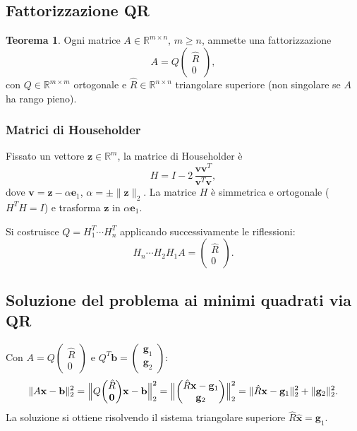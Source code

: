 \documentclass[12pt,a4paper]{article}
\theoremstyle{definition}
\newtheorem{teorema}{Teorema}[section]
\begin{document}
\subsection{Fattorizzazione QR}

\begin{teorema}
Ogni matrice $A \in \mathbb{R}^{m \times n}$, $m \geq n$, ammette una fattorizzazione
\[
  A = Q \begin{pmatrix} \hat{R} \\ 0 \end{pmatrix},
\]
con $Q \in \mathbb{R}^{m \times m}$ ortogonale e $\hat{R} \in \mathbb{R}^{n \times n}$ triangolare superiore (non singolare se $A$ ha rango pieno).
\end{teorema}

\subsubsection{Matrici di Householder}

Fissato un vettore $\mathbf{z} \in \mathbb{R}^m$, la matrice di Householder è
\[
  H = I - 2\,\frac{\mathbf{v}\mathbf{v}^T}{\mathbf{v}^T\mathbf{v}},
\]
dove $\mathbf{v} = \mathbf{z} - \alpha\mathbf{e}_1$, $\alpha = \pm\|\mathbf{z}\|_2$. La matrice $H$ è simmetrica e ortogonale ($H^T H = I$) e trasforma $\mathbf{z}$ in $\alpha\mathbf{e}_1$.

Si costruisce $Q = H_1^T \cdots H_n^T$ applicando successivamente le riflessioni:
\[
  H_n \cdots H_2 H_1 A = \begin{pmatrix} \hat{R} \\ 0 \end{pmatrix}.
\]

\subsection{Soluzione del problema ai minimi quadrati via QR}

Con $A = Q\begin{pmatrix}\hat{R}\\0\end{pmatrix}$ e $Q^T\mathbf{b} = \begin{pmatrix}\mathbf{g}_1\\\mathbf{g}_2\end{pmatrix}$:
\[
  \|A\mathbf{x} - \mathbf{b}\|_2^2
  = \Bigl\|Q\!\begin{pmatrix}\hat{R}\\\mathbf{0}\end{pmatrix}\!\mathbf{x} - \mathbf{b}\Bigr\|_2^2
  = \Bigl\|\begin{pmatrix}\hat{R}\mathbf{x} - \mathbf{g}_1\\\mathbf{g}_2\end{pmatrix}\Bigr\|_2^2
  = \|\hat{R}\mathbf{x} - \mathbf{g}_1\|_2^2 + \|\mathbf{g}_2\|_2^2.
\]
La soluzione si ottiene risolvendo il sistema triangolare superiore $\hat{R}\hat{\mathbf{x}} = \mathbf{g}_1$.
\end{document}
